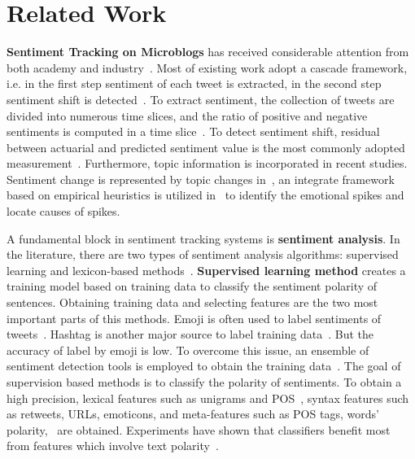 \documentclass[runningheads]{llncs}
\begin{document}
\section{Related Work}\label{sec:related}
\textbf{Sentiment Tracking on Microblogs} has received considerable attention from both academy and industry~\cite{Giachanou2016sentichange,Giachanou2017sentichange,Giachanou2016sentitime,An2014sentimentchange,Bollen2011sentimentchange,Tan2014topic,Montero2016sentimentchange}. Most of existing work adopt a cascade framework, i.e. in the first step sentiment of each tweet is extracted, in the second step sentiment shift is detected~\cite{Giachanou2016sentichange,Giachanou2017sentichange,Giachanou2016sentitime,An2014sentimentchange,Bollen2011sentimentchange,Tan2014topic}. To extract sentiment, the collection of tweets are divided into numerous time slices, and the ratio of positive and negative sentiments is computed in a time slice~\cite{Giachanou2017sentichange,Giachanou2016sentitime,An2014sentimentchange,Bollen2011sentimentchange}. 
To detect sentiment shift, residual between actuarial and predicted sentiment value is the most commonly adopted measurement~\cite{Giachanou2016sentichange,Giachanou2016sentitime}. 
Furthermore, topic information is incorporated in recent studies. Sentiment change is represented by topic changes in~\cite{Tan2014topic}, an integrate framework based on empirical heuristics is utilized in~\cite{Montero2016sentimentchange} to identify
the emotional spikes and locate causes of spikes.%

A fundamental block in sentiment tracking systems is \textbf{sentiment analysis}. In the literature, there are two types of sentiment analysis algorithms: supervised learning and lexicon-based methods~\cite{Ahmed2017SentiCR}. \textbf{Supervised learning method} creates a training model based on training data
to classify the sentiment polarity of sentences. Obtaining training data and selecting features are the two most important parts of this methods. 
Emoji is often used to label sentiments of tweets~\cite{Go2009Supervisedlearning,Pak2010Supervisedlearning}. Hashtag is another major source to label training data~\cite{Papadopoulos2012SocialEvent}.
But the accuracy of label by emoji is low. To overcome this issue, an ensemble of sentiment detection tools is employed to obtain the training data~\cite{Barbosa2010Supervisedlearning}. 
The goal of supervision based methods is to classify the polarity of sentiments. To obtain a high precision, lexical features such as unigrams and POS~\cite{Go2009Supervisedlearning,Davidov2010Supervisedlearning}, syntax features such as retweets, URLs, emoticons, and meta-features such as POS tags, words’ polarity,~\cite{Barbosa2010Supervisedlearning} are obtained.
Experiments have shown that classifiers benefit most from features which involve text polarity~\cite{Agarwal2010Supervisedlearning}.
\end{document}
